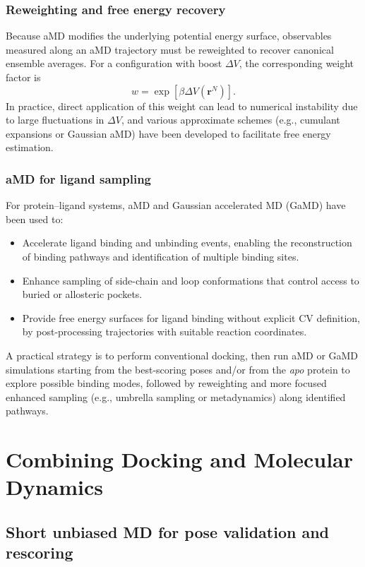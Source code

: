 \documentclass[12pt]{article}
\begin{document}
\subsubsection{Reweighting and free energy recovery}

Because aMD modifies the underlying potential energy surface, observables measured along an aMD trajectory must be reweighted to recover canonical ensemble averages. For a configuration with boost $\Delta V$, the corresponding weight factor is
\[
w = \exp\left[\beta \Delta V(\mathbf{r}^N)\right].
\]
In practice, direct application of this weight can lead to numerical instability due to large fluctuations in $\Delta V$, and various approximate schemes (e.g., cumulant expansions or Gaussian aMD) have been developed to facilitate free energy estimation.\cite{CH9_Miao2015}

\subsubsection{aMD for ligand sampling}

For protein--ligand systems, aMD and Gaussian accelerated MD (GaMD) have been used to:

\begin{itemize}
\item Accelerate ligand binding and unbinding events, enabling the reconstruction of binding pathways and identification of multiple binding sites.
\item Enhance sampling of side-chain and loop conformations that control access to buried or allosteric pockets.
\item Provide free energy surfaces for ligand binding without explicit CV definition, by post-processing trajectories with suitable reaction coordinates.\cite{CH9_Miao2015,CH9_Markwick2011}
\end{itemize}

A practical strategy is to perform conventional docking, then run aMD or GaMD simulations starting from the best-scoring poses and/or from the \textit{apo} protein to explore possible binding modes, followed by reweighting and more focused enhanced sampling (e.g., umbrella sampling or metadynamics) along identified pathways.

\section{Combining Docking and Molecular Dynamics}

\subsection{Short unbiased MD for pose validation and rescoring}
\end{document}
